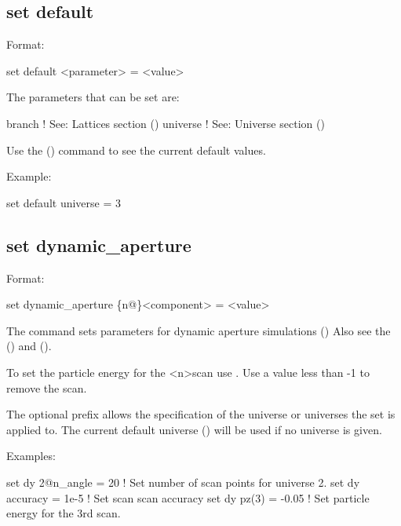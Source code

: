 {{\subsection{set default}
\label{s:set.default}

Format:
\begin{example}
  set default <parameter> = <value>
\end{example}

The parameters that can be set are:
\begin{example}
  branch            ! See: Lattices section ()
  universe          ! See: Universe section ()
\end{example}

Use the  () command to see the current
default values.

Example:
\begin{example}
  set default universe = 3
\end{example}


\subsection{set dynamic_aperture}
\label{s:set.da}

Format:
\begin{example}
  set dynamic_aperture \{n@\}<component> = <value>
\end{example}

The  command sets parameters for dynamic aperture simulations
() Also see the  ()
and  ().

To set the particle energy for the <n>\Th scan use . Use a value less than -1 to remove
the scan.

The optional  prefix allows the specification of the universe or universes the set is applied
to. The current default universe () will be used if no universe is given.

Examples:
\begin{example}
  set dy 2@n_angle = 20   ! Set number of scan points for universe 2.
  set dy accuracy = 1e-5  ! Set scan scan accuracy
  set dy pz(3) = -0.05    ! Set particle energy for the 3rd scan.
\end{example}

}}
